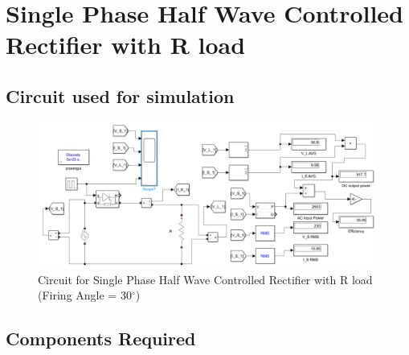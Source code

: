 \section{Single Phase Half Wave Controlled Rectifier with R load}

\subsection{Circuit used for simulation}

\begin{figure}[h]
    \centering
    \includegraphics[width=1.0\textwidth]{images/experiment-1/circuit-diagram-experiment-05.png}
    \caption{Circuit for Single Phase Half Wave Controlled Rectifier with R load  (Firing Angle = 30$ ^\circ $)}
    \label{Fig_simulation_circuit_single-phase-half-wave-controlled-rectifier-with-R-load}
\end{figure}

\subsection{Components Required}

